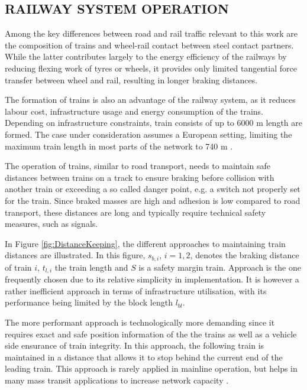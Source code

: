 \documentclass[a4paper, 12pt]{scrartcl}
\begin{document}
\subsection{\uppercase{Railway System Operation}}
Among the key differences between road and rail traffic relevant to this work are the composition of trains and wheel-rail contact between steel contact partners. While the latter contributes largely to the energy efficiency of the railways by reducing flexing work of tyres or wheels, it provides only limited tangential force transfer between wheel and rail, resulting in longer braking distances. 

The formation of trains is also an advantage of the railway system, as it reduces labour cost, infrastructure usage and energy consumption of the trains. Depending on infrastructure constraints, train consists of up to 6000 m length are formed. The case under consideration assumes a European setting, limiting the maximum train length in most parts of the network to 740 m \cite{tsiinf}.

The operation of trains, similar to road transport, needs to maintain safe distances between trains on a track to ensure braking before collision with another train or exceeding a so called danger point, e.g. a switch not properly set for the train. Since braked masses are high and adhesion is low compared to road transport, these distances are long and typically require technical safety measures, such as signals.

In Figure \ref{fig:DistanceKeeping}, the different approaches to maintaining train distances are illustrated. In this figure, $s_{b,i}$, $i = 1,2$, denotes the braking distance of train $i$, $t_{l, i}$ the train length and $S$ is a safety margin train. Approach  is the one frequently chosen due to its relative simplicity in implementation. It is however a rather inefficient approach in terms of infrastructure utilisation, with its performance being limited by the block length $l_{bl}$. 

The more performant approach  is technologically more demanding since it requires exact and safe position information of the the trains as well as a vehicle side ensurance of train integrity. In this approach, the following train is maintained in a distance that allows it to stop behind the current end of the leading train. This approach is rarely applied in mainline operation, but helps in many mass transit applications to increase network capacity \cite{pachl2011systemtechnik}. 
\end{document}
